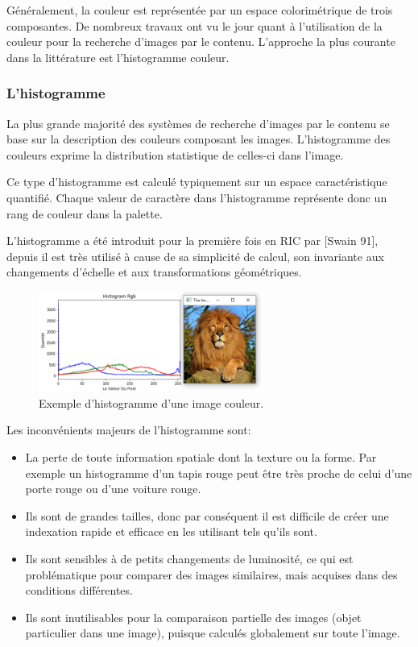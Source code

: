 Généralement, la couleur est représentée par un espace colorimétrique de trois composantes. De nombreux travaux ont vu le jour quant à l’utilisation de la couleur pour la recherche d’images par le contenu. L’approche la plus courante dans la littérature est l’histogramme couleur.

\subsubsection{L'histogramme}
La plus grande majorité des systèmes de recherche d'images par le contenu se base sur la description des couleurs composant les images. L'histogramme des couleurs exprime la distribution statistique de celles-ci dans l'image.

Ce type d'histogramme est calculé typiquement sur un espace caractéristique quantifié. Chaque valeur de caractère dans l'histogramme représente donc un rang de couleur dans la palette. 

L'histogramme a été introduit pour la première fois en  RIC par [Swain 91], depuis il est très utilisé à cause de sa simplicité de calcul, son invariante aux changements d'échelle et aux transformations géométriques.\\

\begin{figure}[H]
	\label{fig:hist}
	\centering
	\includegraphics[width=0.65\textwidth]{Figures/hist} %
	\caption{Exemple d’histogramme d’une image couleur.}
\end{figure}

Les inconvénients majeurs de l'histogramme sont:
\begin{itemize}
	\item La perte de toute information spatiale dont la texture ou la forme. Par exemple un histogramme d'un tapis rouge peut être très proche de celui d'une porte rouge ou d'une voiture rouge.
	
	\item Ils sont de grandes tailles, donc par conséquent il est difficile de créer une indexation rapide et efficace en les utilisant tels qu'ils sont. 
	
	\item Ils sont sensibles à de petits changements de luminosité, ce qui est problématique pour comparer des images similaires, mais acquises dans des conditions différentes. 
	
	\item Ils sont inutilisables pour la comparaison partielle des images (objet particulier dans une image), puisque calculés globalement sur toute l’image.
	
\end{itemize}

